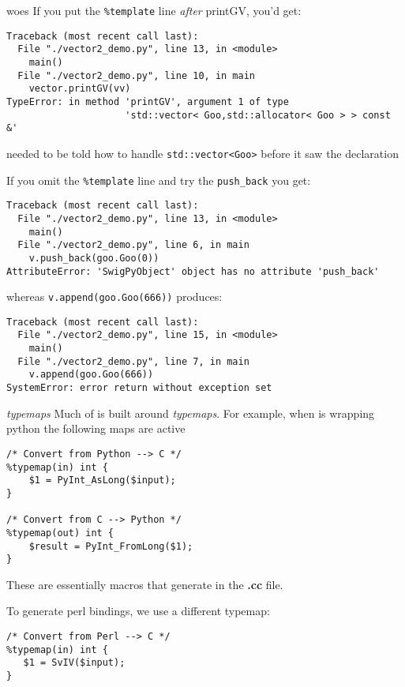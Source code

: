 \documentclass[10pt, t]{beamer}
\let\texttt=\graytt
\let\alert=\textbf
\newcommand{\swig}{\texttt{swig}\xspace}  %
\begin{document}
\begin{frame}[fragile,label=sec-6-21]{\swig woes}
 \vspace*{-3mm}
If you put the \verb~%template~ line \emph{after} printGV, you'd get:
\lstset{language=C++,label= ,caption= ,numbers=none}
\begin{lstlisting}
Traceback (most recent call last):
  File "./vector2_demo.py", line 13, in <module>
    main()
  File "./vector2_demo.py", line 10, in main
    vector.printGV(vv)
TypeError: in method 'printGV', argument 1 of type 
                     'std::vector< Goo,std::allocator< Goo > > const &'
\end{lstlisting}

\pause
\swig needed to be told how to handle \verb~std::vector<Goo>~ before it saw the declaration

\pause
If you omit the \verb~%template~ line and try the \verb~push_back~ you get:
\lstset{language=c++,label= ,caption= ,numbers=none}
\begin{lstlisting}
Traceback (most recent call last):
  File "./vector2_demo.py", line 13, in <module>
    main()
  File "./vector2_demo.py", line 6, in main
    v.push_back(goo.Goo(0))
AttributeError: 'SwigPyObject' object has no attribute 'push_back'
\end{lstlisting}
\pause
whereas \verb~v.append(goo.Goo(666))~ produces:
\lstset{language=c++,label= ,caption= ,numbers=none}
\begin{lstlisting}
Traceback (most recent call last):
  File "./vector2_demo.py", line 15, in <module>
    main()
  File "./vector2_demo.py", line 7, in main
    v.append(goo.Goo(666))
SystemError: error return without exception set
\end{lstlisting}
\end{frame}

\begin{frame}[fragile,label=sec-6-22]{\swig \emph{typemaps}}
 Much of \swig is built around \emph{typemaps}. 
\pause
For example, when \swig is wrapping python the following maps are active
\lstset{language=C,label= ,caption= ,numbers=none}
\begin{lstlisting}
/* Convert from Python --> C */
%typemap(in) int {
    $1 = PyInt_AsLong($input);
}

/* Convert from C --> Python */
%typemap(out) int {
    $result = PyInt_FromLong($1);
}
\end{lstlisting}
These are essentially macros that generate \CPP in the \alert{\wrap.cc} file.

\pause
To generate perl bindings, we use a different typemap:
\lstset{language=C,label= ,caption= ,numbers=none}
\begin{lstlisting}
/* Convert from Perl --> C */
%typemap(in) int {
   $1 = SvIV($input);
}
\end{lstlisting}
\end{frame}
\end{document}

